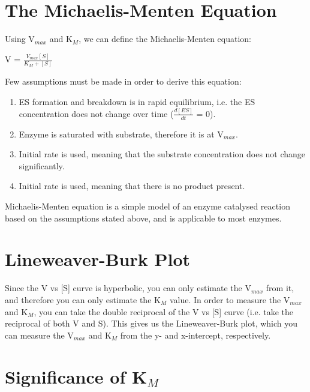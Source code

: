 \section{The Michaelis-Menten Equation}

Using V$_{max}$ and K$_M$, we can define the Michaelis-Menten equation:

\begin{center}
\large{V = $\frac{V_{max} [S]}{K_M + [S]}$}
\end{center}

Few assumptions must be made in order to derive this equation:
\begin{center}
\end{center}
\begin{enumerate}
\item ES formation and breakdown is in rapid equilibrium, i.e. the ES concentration does not change over time ({$\frac{d[ES]}{dt}$} = 0).
\item Enzyme is saturated with substrate, therefore it is at V$_{max}$.
\item Initial rate is used, meaning that the substrate concentration does not change significantly.
\item Initial rate is used, meaning that there is no product present.
\end{enumerate}

Michaelis-Menten equation is a simple model of an enzyme catalysed reaction based on the assumptions stated above, and is applicable to most enzymes.

\section{Lineweaver-Burk Plot}

Since the V vs [S] curve is hyperbolic, you can only estimate the V$_{max}$ from it, and therefore you can only estimate the K$_M$ value.
In order to measure the V$_{max}$ and K$_M$, you can take the double reciprocal of the V vs [S] curve (i.e. take the reciprocal of both V and S).
This gives us the Lineweaver-Burk plot, which you can measure the V$_{max}$ and K$_M$ from the y- and x-intercept, respectively.

\section{Significance of K$_M$}

\begin{center}
\end{center}

